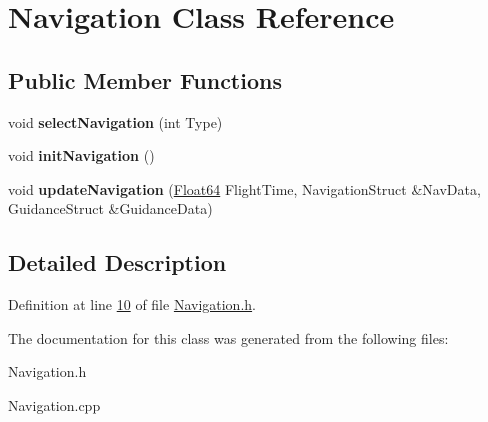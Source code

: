 \hypertarget{class_navigation}{}\section{Navigation Class Reference}
\label{class_navigation}
\subsection*{Public Member Functions}
\begin{DoxyCompactItemize}
\item 
\mbox{\label{class_navigation_a28fa35df18463041f124bfca64192b1d}} 
void {\bfseries select\+Navigation} (int Type)
\item 
\mbox{\label{class_navigation_aca0fd3be695748b9134a2e3fa9734c46}} 
void {\bfseries init\+Navigation} ()
\item 
\mbox{\label{class_navigation_ac518fec078d40dee8336e8594f43f83e}} 
void {\bfseries update\+Navigation} (\hyperlink{group___tools_ga3f1431cb9f76da10f59246d1d743dc2c}{Float64} Flight\+Time, Navigation\+Struct \&Nav\+Data, Guidance\+Struct \&Guidance\+Data)
\end{DoxyCompactItemize}


\subsection{Detailed Description}


Definition at line \hyperlink{_navigation_8h_source_l00010}{10} of file \hyperlink{_navigation_8h_source}{Navigation.\+h}.



The documentation for this class was generated from the following files\+:\begin{DoxyCompactItemize}
\item 
Navigation.\+h\item 
Navigation.\+cpp\end{DoxyCompactItemize}
